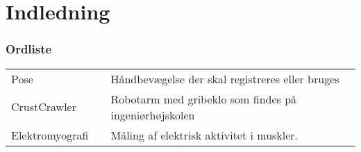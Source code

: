 \thispagestyle{fancy}
\chapter{Indledning}
\label{chp:indledning}


\subsection*{Ordliste}
\begin{tabular}{lll}
	Pose && Håndbevægelse der skal registreres eller bruges\\
	CrustCrawler && Robotarm med gribeklo som findes på ingeniørhøjskolen\\
	Elektromyografi && Måling af elektrisk aktivitet i muskler.
\end{tabular}